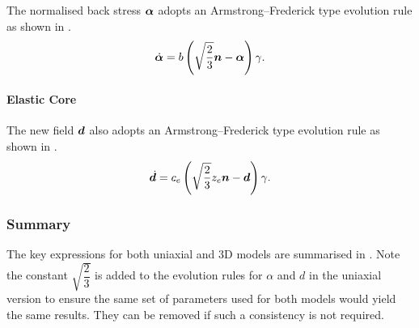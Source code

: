     The normalised back stress $\bm{\alpha}$ adopts an Armstrong--Frederick type evolution rule as shown in .
    \begin{gather}
        \dot{\bm{\alpha}}=b\left(\sqrt{\dfrac{2}{3}}\bm{n}-\bm{\alpha}\right)\gamma.
    \end{gather}
    \paragraph{Elastic Core}
    The new field $\bm{d}$ also adopts an Armstrong--Frederick type evolution rule as shown in .
    \begin{gather}
    \dot{\bm{d}}=c_e\left(\sqrt{\dfrac{2}{3}}z_e\bm{n}-\bm{d}\right)\gamma.
\end{gather}
\subsubsection{Summary}
The key expressions for both uniaxial and 3D models are summarised in .
Note the constant $\sqrt{\dfrac{2}{3}}$ is added to the evolution rules for $\alpha$ and $d$ in the uniaxial version to ensure the same set of parameters used for both models would yield the same results.
They can be removed if such a consistency is not required.
